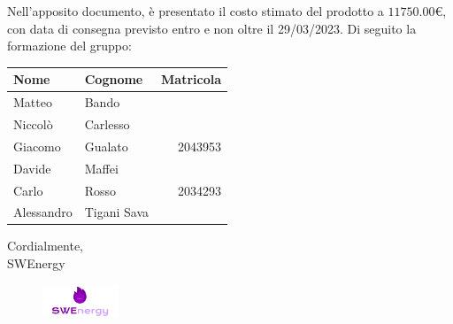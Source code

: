 Nell’apposito documento, è presentato il costo stimato del prodotto a 
$11750.00$€, 
con data di consegna previsto entro e non oltre il 29/03/2023. Di seguito la
formazione del gruppo:

\begin{center}
{
\renewcommand{\arraystretch}{1.5}
\begin{tabular}{llr}
	\textbf{Nome} & \textbf{Cognome}	& \textbf{Matricola}	\\
	\toprule
	Matteo		&	Bando				&						\\
	Niccolò 	&	Carlesso		 	& 						\\
	Giacomo 	&	Gualato			 	& 	2043953					\\
	Davide		&	Maffei			 	& 						\\
	Carlo		&	Rosso			 	&	2034293				\\
	Alessandro	&	Tigani Sava		 	&						\\
	\bottomrule
\end{tabular}
}
\end{center}

\vspace{1cm}

\noindent
Cordialmente, \\
SWEnergy

\begin{figure}[H]
	\includegraphics[width=0.2\textwidth]{img/logo.png}
\end{figure}

